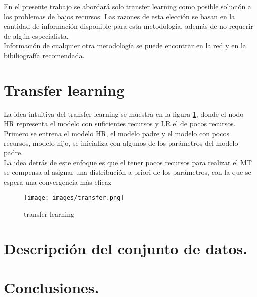\documentclass[12pt,twocolumn, letterpaper]{article}
\begin{document}
En el presente trabajo se abordará solo transfer learning como posible solución a los problemas de bajos recursos. Las razones de esta elección se basan en la cantidad de información disponible para esta metodología, además de no requerir de algún especialista.\\

Información de cualquier otra metodología se puede encontrar en la red y en la bibiliografía recomendada.

\section{Transfer learning}
La idea intuitiva del transfer learning se muestra en la figura \ref{transfer}, donde el nodo HR representa el modelo con suficientes recursos y LR el de pocos recursos.\\

Primero se entrena el modelo HR, el modelo padre y el modelo con pocos recursos, modelo hijo, se inicializa con algunos de los parámetros del modelo padre.\\

La idea detrás de este enfoque es que el tener pocos recursos para realizar el MT se compensa al asignar una distribución a priori de los parámetros, con la que se espera una convergencia más eficaz\\

\begin{figure}
\centering
\texttt{[image: images/transfer.png]} 
\caption{transfer learning}
\label{transfer}
\end{figure}

\section{Descripción del conjunto de datos.}


\section{Conclusiones.}
\end{document}

